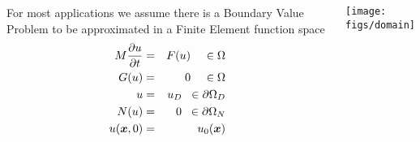 \begin{frame}
  \begin{columns}[t]
    \begin{block}{}%
      For most applications we assume there is a Boundary Value Problem
      to be approximated in a Finite Element function space
      \begin{eqnarray}
	\label{eqn:general_pde}
	\nonumber
	M \frac{\partial u}{\partial t} & = & F( u ) \;\;\;\; \in \Omega
        \\
	\nonumber
	G( u ) & = & 0 \;\;\;\; \in \Omega
	\\
	\nonumber
	u & = & u_D \;\; \in \partial \Omega_D
	\\
	\nonumber
	N(u) & = & 0 \;\; \in \partial \Omega_N
 	\\
 	\nonumber
 	u({\boldsymbol{x}}, 0) & = & u_0({\boldsymbol{x}}) 
      \end{eqnarray}
    \end{block}
      \begin{center}
	\texttt{[image: figs/domain]}
      \end{center}
  \end{columns}
\end{frame}


